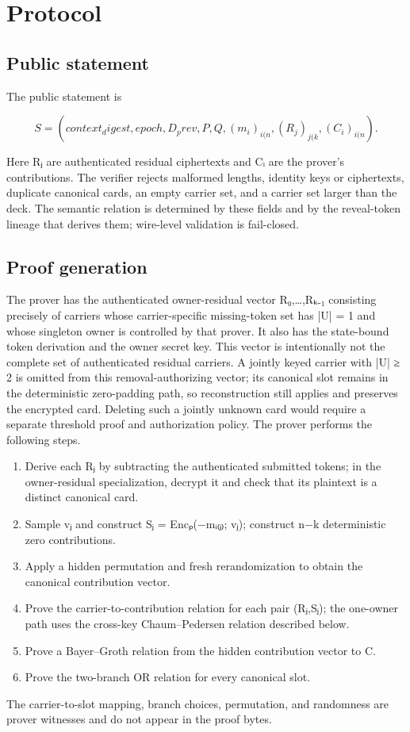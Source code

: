 \documentclass[11pt]{article}
\begin{document}
\section{Protocol}

\subsection{Public statement}

The public statement is

\begin{displaymath}S = (context_digest, epoch, D_prev, P, Q, (m_{i})_{i(n}, (R_{j})_{j(k}, (C_{i})_{i(n}).\end{displaymath}

Here Rⱼ are authenticated residual ciphertexts and Cᵢ are the prover’s contributions. The verifier rejects malformed lengths, identity keys or ciphertexts, duplicate canonical cards, an empty carrier set, and a carrier set larger than the deck. The semantic relation is determined by these fields and by the reveal-token lineage that derives them; wire-level validation is fail-closed.

\subsection{Proof generation}

The prover has the authenticated owner-residual vector R₀,…,Rₖ₋₁ consisting precisely of carriers whose carrier-specific missing-token set has |U| = 1 and whose singleton owner is controlled by that prover. It also has the state-bound token derivation and the owner secret key. This vector is intentionally not the complete set of authenticated residual carriers. A jointly keyed carrier with |U| ≥ 2 is omitted from this removal-authorizing vector; its canonical slot remains in the deterministic zero-padding path, so reconstruction still applies and preserves the encrypted card. Deleting such a jointly unknown card would require a separate threshold proof and authorization policy. The prover performs the following steps.

\begin{enumerate}
\item Derive each Rⱼ by subtracting the authenticated submitted tokens; in the owner-residual specialization, decrypt it and check that its plaintext is a distinct canonical card.
\item Sample vⱼ and construct Sⱼ = Encₚ(−mᵢ₍ⱼ₎; vⱼ); construct n−k deterministic zero contributions.
\item Apply a hidden permutation and fresh rerandomization to obtain the canonical contribution vector.
\item Prove the carrier-to-contribution relation for each pair (Rⱼ,Sⱼ); the one-owner path uses the cross-key Chaum–Pedersen relation described below.
\item Prove a Bayer–Groth relation from the hidden contribution vector to C.
\item Prove the two-branch OR relation for every canonical slot.
\end{enumerate}
The carrier-to-slot mapping, branch choices, permutation, and randomness are prover witnesses and do not appear in the proof bytes.
\end{document}
